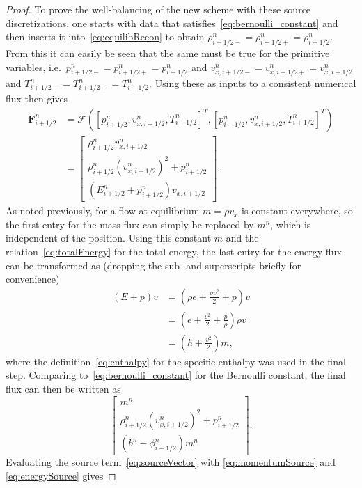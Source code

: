 \begin{proof}
  To prove the well-balancing of the new scheme with these source discretizations, one starts with data that satisfies~\eqref{eq:bernoulli_constant} and then inserts it into~\eqref{eq:equilibRecon} to obtain $\rho_{i+1/2-}^n=\rho_{i+1/2+}^n=\rho_{i+1/2}^n$. From this it can easily be seen that the same must be true for the primitive variables, i.e.\ $p_{i+1/2-}^n=p_{i+1/2+}^n=p_{i+1/2}^n$ and $v_{x,i+1/2-}^n=v_{x,i+1/2+}^n=v_{x,i+1/2}^n$ and $T_{i+1/2-}^n=T_{i+1/2+}^n=T_{i+1/2}^n$. Using these as inputs to a consistent numerical flux then gives
\begin{align*}
\mathbf{F}_{i+1/2}^n&=\bm{\mathcal{F}}\left([p_{i+1/2}^n,v_{x,i+1/2}^n,T_{i+1/2}^n]^T,[p_{i+1/2}^n,v_{x,i+1/2}^n,T_{i+1/2}^n]^T\right) \\
&=
\begin{bmatrix}
\rho_{i+1/2}^n v_{x,i+1/2}^n \\ \rho_{i+1/2}^n\left(v_{x,i+1/2}^n\right)^2+p_{i+1/2}^n \\ \left(E_{i+1/2}^n+p_{i+1/2}^n\right)v_{x,i+1/2}
\end{bmatrix}.
\end{align*}
As noted previously, for a flow at equilibrium $m=\rho v_x$ is constant everywhere, so the first entry for the mass flux can simply be replaced by $m^n$, which is independent of the position. Using this constant $m$ and the relation~\eqref{eq:totalEnergy} for the total energy, the last entry for the energy flux can be transformed as (dropping the sub- and superscripts briefly for convenience)
\begin{align*}
\left(E+p\right)v&=\left(\rho e + \frac{\rho v^2}{2}+p\right)v \\
&=\left(e + \frac{v^2}{2}+\frac{p}{\rho}\right)\rho v \\
&=\left(h + \frac{v^2}{2}\right)m,
\end{align*}
where the definition~\eqref{eq:enthalpy} for the specific enthalpy was used in the final step. Comparing to~\eqref{eq:bernoulli_constant} for the Bernoulli constant, the final flux can then be written as
\begin{equation*}
\begin{bmatrix}
m^n \\ \rho_{i+1/2}^n\left(v_{x,i+1/2}^n\right)^2+p_{i+1/2}^n \\ \left(b^n-\phi_{i+1/2}^n\right)m^n
\end{bmatrix}.
\end{equation*}
Evaluating the source term~\eqref{eq:sourceVector} with \eqref{eq:momentumSource} and \eqref{eq:energySource} gives

\end{proof}

